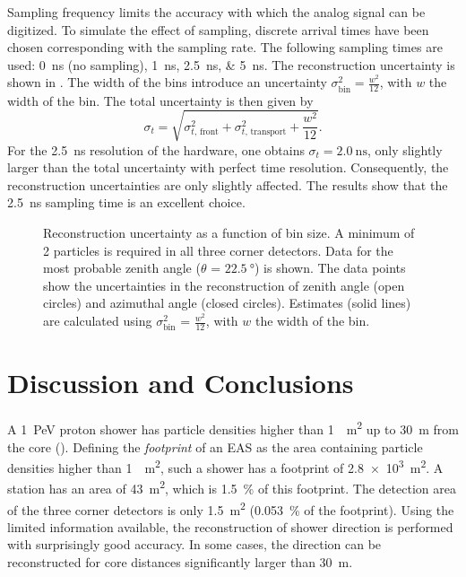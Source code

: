 Sampling frequency limits the accuracy with which the analog signal can be
digitized.
To simulate the effect of sampling, discrete arrival times have been chosen
corresponding with the sampling rate.
The following sampling times are used: \SI{0}{\nano\second} (no sampling),
\SIlist{1;2.5;5}{\nano\second}.
The reconstruction uncertainty is shown in
.  The width of the bins introduce an uncertainty
$\sigma_{\mathrm{bin}}^2 = \frac{w^2}{12}$, with $w$ the width of the bin.  The
total uncertainty is then given by
\begin{equation}
\sigma_t = \sqrt{\sigma_{t,\, \mathrm{front}}^2 + \sigma_{t,\, \mathrm{transport}}^2 + \frac{w^2}{12}}.
\label{eq:ch4-timing2}
\end{equation}
For the \SI{2.5}{\nano\second} resolution of the \hisparc hardware, one obtains
$\sigma_t = \SI{2.0}{\nano\second}$, only slightly larger than the total
uncertainty with perfect time resolution.  Consequently, the reconstruction
uncertainties are only slightly affected. The results show that the
\SI{2.5}{\nano\second} sampling time is an excellent choice.

\begin{figure}
\centering

\caption{Reconstruction uncertainty as a function of bin size.  A minimum
of 2 particles is required in all three corner detectors.  Data for the
most probable zenith angle ($\theta$ = $\SI{22.5}{\degree}$) is shown.  The
data points show the uncertainties in the reconstruction of zenith angle
(open circles) and azimuthal angle (closed circles).  Estimates (solid
lines) are calculated using $\sigma_{\mathrm{bin}}^2$ = $\frac{w^2}{12}$,
with $w$ the width of the bin.}
\label{fig:results-binsize}
\end{figure}


\section{Discussion and Conclusions}
\label{sec:reconstruction-conclusions}

A \SI{1}{\peta\electronvolt} proton shower has particle densities higher than
\SI{1}{\per\square\meter} up to \SI{30}{\meter}
from the core ().
Defining the \emph{footprint} of an EAS as the area containing particle
densities higher than \SI{1}{\per\square\meter}, such a shower has a footprint
of \SI{2.8e3}{\square\meter}.
A \hisparc station has an area of \SI{43}{\square\meter}, which is
\SI{1.5}{\percent} of this footprint. The detection area of the three corner
detectors is only \SI{1.5}{\square\meter} (\SI{0.053}{\percent} of the
footprint).
Using the limited information available, the reconstruction of shower direction
is performed with surprisingly good accuracy. In some cases, the direction can
be reconstructed for core distances significantly larger than \SI{30}{\meter}.

